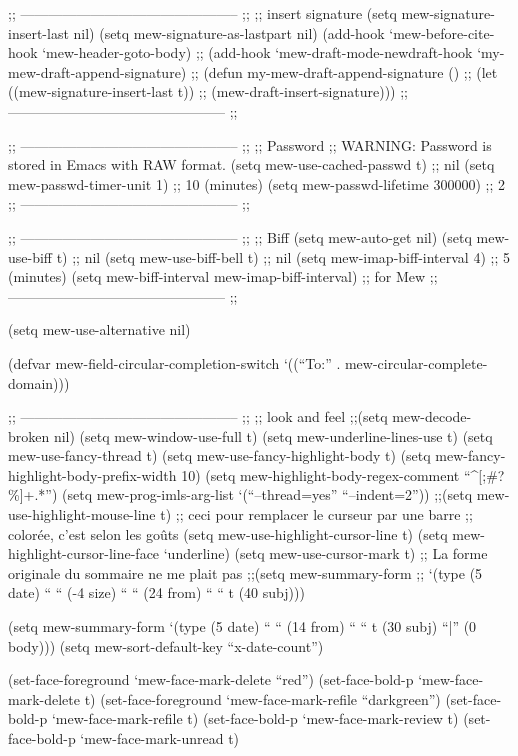 \documentclass[11pt]{article}
\begin{document}
;; ----------------------------------------------- ;;
;; insert signature
(setq mew-signature-insert-last nil)
(setq mew-signature-as-lastpart nil)
(add-hook `mew-before-cite-hook `mew-header-goto-body)
;; (add-hook `mew-draft-mode-newdraft-hook `my-mew-draft-append-signature)
;; (defun my-mew-draft-append-signature ()
;;   (let ((mew-signature-insert-last t))
;;     (mew-draft-insert-signature)))
;; ----------------------------------------------- ;;



;; ----------------------------------------------- ;;
;; Password
;; WARNING: Password is stored in Emacs with RAW format.
(setq mew-use-cached-passwd t)    ;; nil
(setq mew-passwd-timer-unit 1)    ;; 10 (minutes)
(setq mew-passwd-lifetime 300000) ;; 2
;; ----------------------------------------------- ;;


;; ----------------------------------------------- ;;
;; Biff
(setq mew-auto-get nil)
(setq mew-use-biff t)                         ;; nil
(setq mew-use-biff-bell t)                      ;; nil
(setq mew-imap-biff-interval 4)                 ;; 5 (minutes)
(setq mew-biff-interval mew-imap-biff-interval) ;; for Mew 
;; ----------------------------------------------- ;;



(setq mew-use-alternative nil)

(defvar mew-field-circular-completion-switch
  `((``To:'' . mew-circular-complete-domain)))


;; ----------------------------------------------- ;;
;; look and feel
;;(setq mew-decode-broken nil)
(setq mew-window-use-full t)
(setq mew-underline-lines-use t)
(setq mew-use-fancy-thread t)
(setq mew-use-fancy-highlight-body t)
(setq mew-fancy-highlight-body-prefix-width 10)
(setq mew-highlight-body-regex-comment ``^[;\#?\%]+.*'')
(setq mew-prog-imls-arg-list `(``--thread=yes'' ``--indent=2''))
;;(setq mew-use-highlight-mouse-line t)
;; ceci pour remplacer le curseur par une barre
;; colorée, c'est selon les goûts
(setq mew-use-highlight-cursor-line t)
(setq mew-highlight-cursor-line-face `underline)
(setq mew-use-cursor-mark t)
;; La forme originale du sommaire ne me plait pas
;;(setq mew-summary-form
;;            `(type (5 date) `` `` (-4 size) `` `` (24 from) `` `` t (40 subj)))

(setq mew-summary-form
      `(type (5 date) `` `` (14 from) `` `` t (30 subj) ``|'' (0 body)))
(setq mew-sort-default-key ``x-date-count'')

(set-face-foreground   `mew-face-mark-delete    ``red'') 
(set-face-bold-p       `mew-face-mark-delete  t)
(set-face-foreground   `mew-face-mark-refile    ``darkgreen'') 
(set-face-bold-p       `mew-face-mark-refile  t)
(set-face-bold-p       `mew-face-mark-review  t)
(set-face-bold-p       `mew-face-mark-unread  t)
\end{document}
